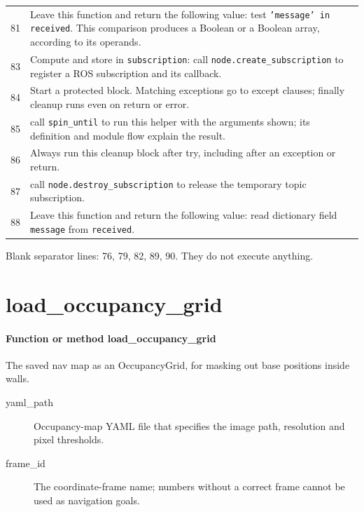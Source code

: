 \documentclass[11pt,a4paper]{book}
\begin{document}
\begin{longtable}{r p{}}
81 & Leave this function and return the following value: test \texttt{'message' in received}. This comparison produces a Boolean or a Boolean array, according to its operands. \\

83 & Compute and store in \texttt{subscription}: call \texttt{node.create\_subscription} to register a ROS subscription and its callback.  \\

84 & Start a protected block. Matching exceptions go to except clauses; finally cleanup runs even on return or error. \\

85 & call \texttt{spin\_until} to run this helper with the arguments shown; its definition and module flow explain the result. \\

86 & Always run this cleanup block after try, including after an exception or return. \\

87 & call \texttt{node.destroy\_subscription} to release the temporary topic subscription. \\

88 & Leave this function and return the following value: read dictionary field \texttt{message} from \texttt{received}. \\

\end{longtable}

Blank separator lines: 76, 79, 82, 89, 90. They do not execute anything.

\section{load\_occupancy\_grid}

\paragraph{Function or method load\_occupancy\_grid}
The saved nav map as an OccupancyGrid, for masking out base positions inside walls.

\begin{description}
\item[yaml\_path] Occupancy-map YAML file that specifies the image path, resolution and pixel thresholds.
\item[frame\_id] The coordinate-frame name; numbers without a correct frame cannot be used as navigation goals.
\end{description}
\end{document}
